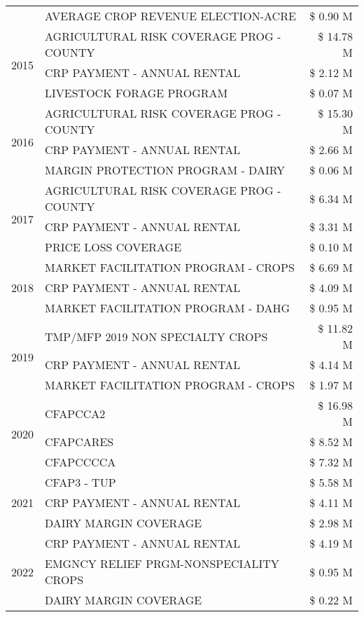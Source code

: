 \begin{tabular}{llr}
 & AVERAGE CROP REVENUE ELECTION-ACRE & \$ 0.90 M \\
\cline{1-3}
\multirow[t]{3}{*}{2015} & AGRICULTURAL RISK COVERAGE PROG - COUNTY & \$ 14.78 M \\
 & CRP PAYMENT - ANNUAL RENTAL & \$ 2.12 M \\
 & LIVESTOCK FORAGE PROGRAM & \$ 0.07 M \\
\cline{1-3}
\multirow[t]{3}{*}{2016} & AGRICULTURAL RISK COVERAGE PROG - COUNTY & \$ 15.30 M \\
 & CRP PAYMENT - ANNUAL RENTAL & \$ 2.66 M \\
 & MARGIN PROTECTION PROGRAM - DAIRY & \$ 0.06 M \\
\cline{1-3}
\multirow[t]{3}{*}{2017} & AGRICULTURAL RISK COVERAGE PROG - COUNTY & \$ 6.34 M \\
 & CRP PAYMENT - ANNUAL RENTAL & \$ 3.31 M \\
 & PRICE LOSS COVERAGE & \$ 0.10 M \\
\cline{1-3}
\multirow[t]{3}{*}{2018} & MARKET FACILITATION PROGRAM - CROPS & \$ 6.69 M \\
 & CRP PAYMENT - ANNUAL RENTAL & \$ 4.09 M \\
 & MARKET FACILITATION PROGRAM - DAHG & \$ 0.95 M \\
\cline{1-3}
\multirow[t]{3}{*}{2019} & TMP/MFP 2019 NON SPECIALTY CROPS & \$ 11.82 M \\
 & CRP PAYMENT - ANNUAL RENTAL & \$ 4.14 M \\
 & MARKET FACILITATION PROGRAM - CROPS & \$ 1.97 M \\
\cline{1-3}
\multirow[t]{3}{*}{2020} & CFAPCCA2 & \$ 16.98 M \\
 & CFAPCARES & \$ 8.52 M \\
 & CFAPCCCCA & \$ 7.32 M \\
\cline{1-3}
\multirow[t]{3}{*}{2021} & CFAP3 - TUP & \$ 5.58 M \\
 & CRP PAYMENT - ANNUAL RENTAL & \$ 4.11 M \\
 & DAIRY MARGIN COVERAGE & \$ 2.98 M \\
\cline{1-3}
\multirow[t]{3}{*}{2022} & CRP PAYMENT - ANNUAL RENTAL & \$ 4.19 M \\
 & EMGNCY RELIEF PRGM-NONSPECIALITY CROPS & \$ 0.95 M \\
 & DAIRY MARGIN COVERAGE & \$ 0.22 M \\
\cline{1-3}
\bottomrule
\end{tabular}
